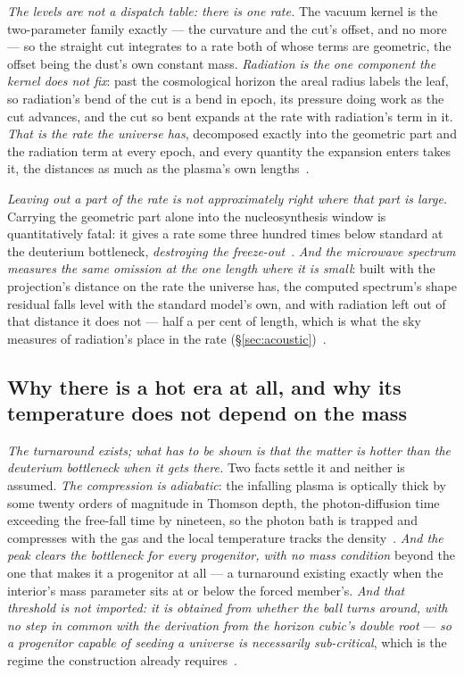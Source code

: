 \documentclass[11pt,a4paper]{article}
\theoremstyle{plain}
\theoremstyle{definition}
\begin{document}
\emph{The levels are not a dispatch table: there is one rate.} The vacuum kernel is the two-parameter family
exactly --- the curvature and the cut's offset, and no more --- so the straight cut integrates to a rate both of
whose terms are geometric, the offset being the dust's own constant mass. \emph{Radiation is the one component
the kernel does not fix}: past the cosmological horizon the areal radius labels the leaf, so radiation's bend of
the cut is a bend in epoch, its pressure doing work as the cut advances, and the cut so bent expands at the rate
with radiation's term in it. \emph{That is the rate the universe has}, decomposed exactly into the geometric part
and the radiation term at every epoch, and every quantity the expansion enters takes it, the distances as much
as the plasma's own lengths~\cite{JanzenCRcosmology,JanzenCosmogenesis,JanzenOperator}.

\emph{Leaving out a part of the rate is not approximately right where that part is large.} Carrying the
geometric part alone into the nucleosynthesis window is quantitatively fatal: it gives a rate some three hundred
times below standard at the deuterium bottleneck, \emph{destroying the freeze-out}~\cite{JanzenCosmogenesis}.
\emph{And the microwave spectrum measures the same omission at the one length where it is small}: built with the
projection's distance on the rate the universe has, the computed spectrum's shape residual falls level with the
standard model's own, and with radiation left out of that distance it does not --- half a per cent of length,
which is what the sky measures of radiation's place in the rate
(\S\ref{sec:acoustic})~\cite{JanzenCRcosmology}.

\subsection{Why there is a hot era at all, and why its temperature does not depend on the mass}

\emph{The turnaround exists; what has to be shown is that the matter is hotter than the deuterium bottleneck
when it gets there.} Two facts settle it and neither is assumed. \emph{The compression is adiabatic}: the
infalling plasma is optically thick by some twenty orders of magnitude in Thomson depth, the photon-diffusion
time exceeding the free-fall time by nineteen, so the photon bath is trapped and compresses with the gas and
the local temperature tracks the density~\cite{JanzenCosmogenesis}. \emph{And the peak clears the bottleneck
for every progenitor, with no mass condition} beyond the one that makes it a progenitor at all --- a
turnaround existing exactly when the interior's mass parameter sits at or below the forced member's. \emph{And
that threshold is not imported: it is obtained from whether the ball turns around, with no step in common
with the derivation from the horizon cubic's double root} --- \emph{so a progenitor capable of seeding a
universe is necessarily sub-critical}, which is the regime the construction already
requires~\cite{JanzenCosmogenesis}.
\end{document}
